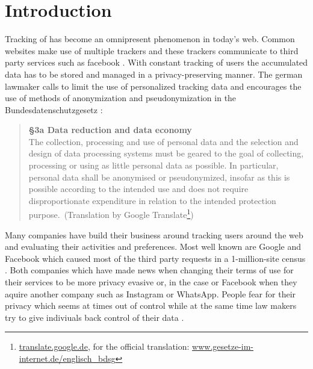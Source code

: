 \documentclass[12pt,a4paper]{scrartcl}				%
\begin{document}
\tableofcontents
\listoffigures

\newpage

\setcounter{page}{1}				%

\section{Introduction}

Tracking of has become an omnipresent phenomenon in today's web. Common websites make use of multiple trackers  and these trackers communicate to third party services such as facebook \cite{HowOnlin70}. With constant tracking of users the accumulated data has to be stored and managed in a privacy-preserving manner. The german lawmaker calls to limit the use of personalized tracking data and encourages the use of methods of anonymization and pseudonymization in the Bundesdatenschutzgesetz \cite{BDSGEinz5}:

\begin{quote}
	\textbf{§3a Data reduction and data economy }\\
	The collection, processing and use of personal data and the selection and design of data processing systems must be geared to the goal of collecting, processing or using as little personal data as possible. In particular, personal data shall be anonymised or pseudonymized, insofar as this is possible according to the intended use and does not require disproportionate expenditure in relation to the intended protection purpose.\ (Translation by Google Translate\footnote{\url{translate.google.de},
		for the official translation: \url{www.gesetze-im-internet.de/englisch_bdsg}})
\end{quote}

 Many companies have build their business around tracking users around the web and evaluating their activities and preferences. Most well known are Google and Facebook which caused most of the third party requests in a 1-million-site census \cite{englehardt2016online}. Both companies which have made news when changing their terms of use for their services to be more privacy evasive or, in the case or Facebook when they aquire another company such as Instagram or WhatsApp. People fear for their privacy which seems at times out of control while at the same time law makers try to give indiviuals back control of their data \cite{NeueEUDa50}.
\end{document}

